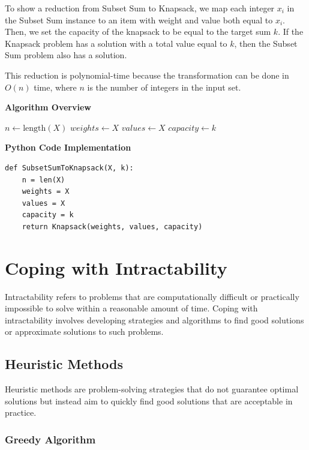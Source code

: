 \documentclass[12pt]{book} %
\begin{document}
To show a reduction from Subset Sum to Knapsack, we map each integer \(x_i\) in the Subset Sum instance to an item with weight and value both equal to \(x_i\). Then, we set the capacity of the knapsack to be equal to the target sum \(k\). If the Knapsack problem has a solution with a total value equal to \(k\), then the Subset Sum problem also has a solution. 

This reduction is polynomial-time because the transformation can be done in \(O(n)\) time, where \(n\) is the number of integers in the input set.

\textbf{Algorithm Overview}
\FloatBarrier
\begin{algorithm}
\caption{Subset Sum to Knapsack Reduction}
\begin{algorithmic}[1]
    \State $n \gets \text{length}(X)$
    \State $weights \gets X$
    \State $values \gets X$
    \State $capacity \gets k$
    \State \Return {}
\EndFunction
\end{algorithmic}
\end{algorithm}
\FloatBarrier

\textbf{Python Code Implementation}
\FloatBarrier
\begin{lstlisting}
def SubsetSumToKnapsack(X, k):
    n = len(X)
    weights = X
    values = X
    capacity = k
    return Knapsack(weights, values, capacity)
\end{lstlisting}
\FloatBarrier

\section{Coping with Intractability}

Intractability refers to problems that are computationally difficult or practically impossible to solve within a reasonable amount of time. Coping with intractability involves developing strategies and algorithms to find good solutions or approximate solutions to such problems.

\subsection{Heuristic Methods}

Heuristic methods are problem-solving strategies that do not guarantee optimal solutions but instead aim to quickly find good solutions that are acceptable in practice.

\subsubsection{Greedy Algorithm}
\end{document}
